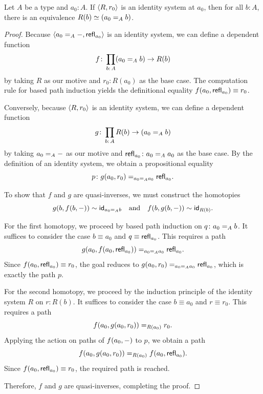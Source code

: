 \begin{thm}\label{thm:identity-systems-are-representable}
    Let\/ $A$ be a type and\/ $a_0\colon A$. If\/ $\langle R,r_0\rangle$ is an identity system at\/ $a_0$, then for all\/ $b\colon A$, there is an equivalence\/ $R(b)\simeq(a_0\mathrel{=_{A}}b)$.
\end{thm}

\begin{proof}
    Because $\langle a_0\mathrel{=_{A}}{\mathord-},\mathsf{refl}_{a_0}\rangle$ is an identity system, we can define a dependent function
    \[
        f\colon\prod_{b\colon A}(a_0\eq Ab)\to R(b)
    \]
    by taking $R$ as our motive and $r_0\colon R(a_0)$ as the base case. The computation rule for based path induction yields the definitional equality $f(a_0,\mathsf{refl}_{a_0})\equiv r_0$.
    
    Conversely, because $\langle R,r_0\rangle$ is an identity system, we can define a dependent function 
    \[
        g\colon\prod_{b\colon A}R(b)\to (a_0\eq Ab)
    \]
    by taking $a_0\mathrel{=_{A}}{\mathord-}$ as our motive and $\fun{refl}_{a_0}\colon a_0\eq Aa_0$ as the base case. By the definition of an identity system, we obtain a propositional equality
    \[
        p\colon g(a_0,r_0)
        \eq{a_0\eq Aa_0}
        \fun{refl}_{a_0}.
    \]
    
    To show that $f$ and $g$ are quasi-inverses, we must construct the homotopies
    \[
        g(b,f(b,{\mathord-}))\sim\mathsf{id}_{a_0\mathrel{=_{A}}b}
    \quad\text{and}\quad
        f(b,g(b,{\mathord-}))\sim\mathsf{id}_{R(b)}.
    \]    
    
    For the first homotopy, we proceed by based path induction on $q\colon a_0\eq Ab$. It suffices to consider the case $b\equiv a_0$ and $q\equiv\mathsf{refl}_{a_0}$. This requires a path
    \[
        g(a_0,f(a_0,\mathsf{refl}_{a_0}))
        \mathrel{=_{a_0\mathrel{=_{A}}a_0}}
        \mathsf{refl}_{a_0}.
    \]
    Since $f(a_0,\mathsf{refl}_{a_0})\equiv r_0$, the goal reduces to $g(a_0,r_0)\mathrel{=_{a_0\mathrel{=_{A}}a_0}}\mathsf{refl}_{a_0}$, which is exactly the path $p$.
    
    For the second homotopy, we proceed by the induction principle of the identity system $R$ on $r\colon R(b)$. It suffices to consider the case $b\equiv a_0$ and $r\equiv r_0$. This requires a path 
    \[
        f(a_0,g(a_0,r_0))\mathrel{=_{R(a_0)}}r_0.
    \]
    Applying the action on paths of $f(a_0,{\mathord-})$ to $p$, we obtain a path 
    \[
        f(a_0,g(a_0,r_0))
        \mathrel{=_{R(a_0)}}
        f(a_0,\mathsf{refl}_{a_0}).
    \]
    Since $f(a_0,\mathsf{refl}_{a_0})\equiv r_0$, the required path is reached.
    
    Therefore, $f$ and $g$ are quasi-inverses, completing the proof.
    
\end{proof}

